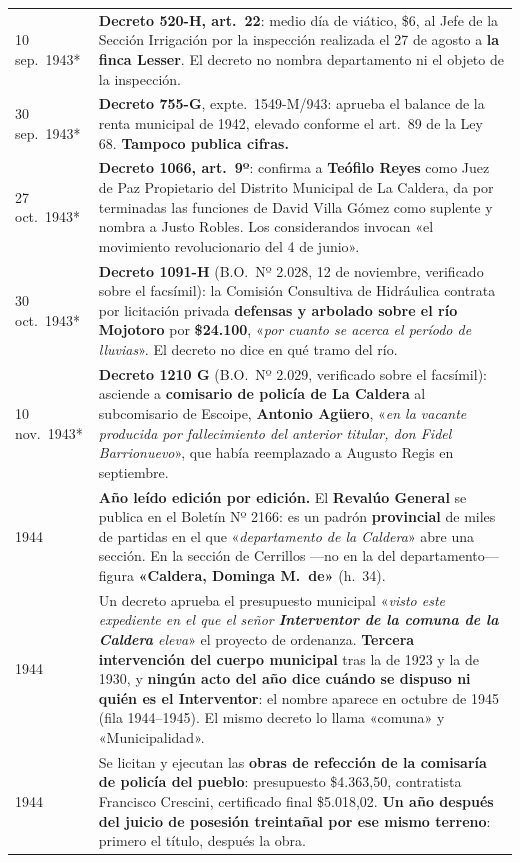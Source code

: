 \begin{longtable}{@{}p{2.7cm}p{10.3cm}@{}}
10 sep.\ 1943* & \textbf{Decreto 520-H, art.\ 22}: medio día de viático, \$6, al Jefe de la Sección Irrigación por la inspección realizada el 27 de agosto a \textbf{la finca Lesser}. El decreto no nombra departamento ni el objeto de la inspección. \\
30 sep.\ 1943* & \textbf{Decreto 755-G}, expte.\ 1549-M/943: aprueba el balance de la renta municipal de 1942, elevado conforme el art.\ 89 de la Ley 68. \textbf{Tampoco publica cifras.} \\
27 oct.\ 1943* & \textbf{Decreto 1066, art.\ 9º}: confirma a \textbf{Teófilo Reyes\index{Reyes, Teófilo}} como Juez de Paz Propietario del Distrito Municipal de La Caldera, da por terminadas las funciones de David Villa Gómez como suplente y nombra a Justo Robles. Los considerandos invocan «el movimiento revolucionario del 4 de junio». \\
30 oct.\ 1943* & \textbf{Decreto 1091-H} (B.O.\ Nº 2.028, 12 de noviembre, verificado sobre el facsímil): la Comisión Consultiva de Hidráulica contrata por licitación privada \textbf{defensas y arbolado sobre el río Mojotoro} por \textbf{\$24.100}, «\textit{por cuanto se acerca el período de lluvias}». El decreto no dice en qué tramo del río. \\
10 nov.\ 1943* & \textbf{Decreto 1210 G} (B.O.\ Nº 2.029, verificado sobre el facsímil): asciende a \textbf{comisario de policía de La Caldera} al subcomisario de Escoipe, \textbf{Antonio Agüero}, «\textit{en la vacante producida por fallecimiento del anterior titular, don Fidel Barrionuevo}», que había reemplazado a Augusto Regis en septiembre. \\
1944 & \textbf{Año leído edición por edición.} El \textbf{Revalúo General} se publica en el Boletín Nº 2166: es un padrón \textbf{provincial} de miles de partidas en el que «\textit{departamento de la Caldera}» abre una sección. En la sección de Cerrillos ---no en la del departamento--- figura \textbf{«Caldera, Dominga M.\ de»} (h.\ 34). \\
1944 & Un decreto aprueba el presupuesto municipal «\textit{visto este expediente en el que el señor \textbf{Interventor de la comuna de la Caldera} eleva}» el proyecto de ordenanza. \textbf{Tercera intervención del cuerpo municipal} tras la de 1923 y la de 1930, y \textbf{ningún acto del año dice cuándo se dispuso ni quién es el Interventor}: el nombre aparece en octubre de 1945 (fila 1944--1945). El mismo decreto lo llama «comuna» y «Municipalidad». \\
1944 & Se licitan y ejecutan las \textbf{obras de refección de la comisaría de policía del pueblo}: presupuesto \$4.363,50, contratista Francisco Crescini, certificado final \$5.018,02. \textbf{Un año después del juicio de posesión treintañal por ese mismo terreno}: primero el título, después la obra. \\

\end{longtable}
